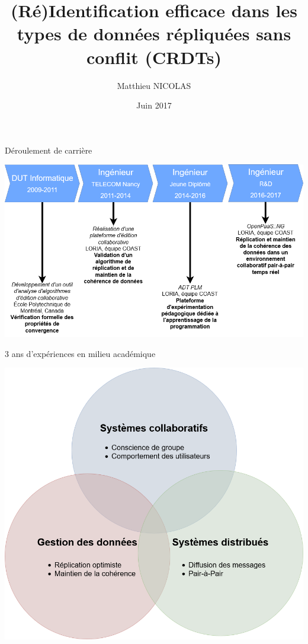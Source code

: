 \documentclass[10pt]{beamer}
\author{Matthieu NICOLAS}
\title{(Ré)Identification efficace dans les types de données répliquées sans conflit (CRDTs)}
\date{Juin 2017}
\begin{document}
\begin{frame}[t,plain]
\titlepage
\end{frame}

\begin{frame}{Déroulement de carrière}
  \begin{center}
    \includegraphics[scale=0.35]{fig/frise.png}
  \end{center}
\end{frame}

\begin{frame}{3 ans d'expériences en milieu académique}
  \begin{center}
    \includegraphics[scale=0.25]{fig/patates.png}
  \end{center}
\end{frame}
\end{document}
